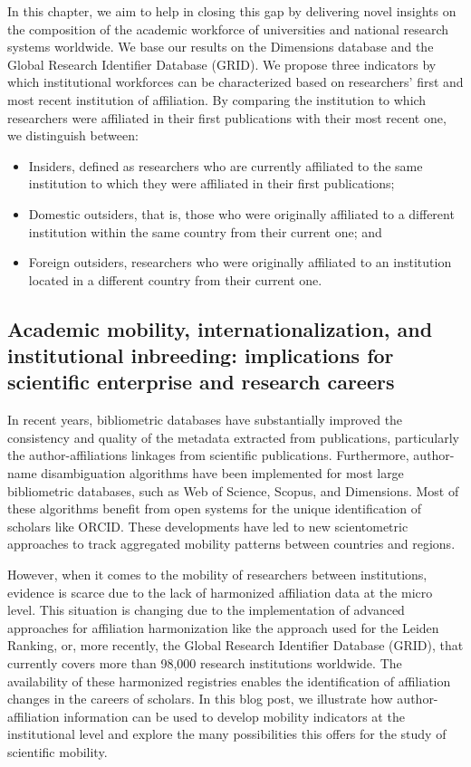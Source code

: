 \documentclass[draft,final]{vutinfth} %
\begin{document}
In this chapter, we aim to help in closing this gap by delivering novel insights on the composition of the academic workforce of universities and national research systems worldwide. We base our results on the Dimensions database and the Global Research Identifier Database (GRID). We propose three indicators by which institutional workforces can be characterized based on researchers' first and most recent institution of affiliation. By comparing the institution to which researchers were affiliated in their first publications with their most recent one, we distinguish between: 

\begin{itemize}
    \item Insiders, defined as researchers who are currently affiliated to the same institution to which they were affiliated in their first publications; 
    \item Domestic outsiders, that is, those who were originally affiliated to a different institution within the same country from their current one; and
    \item Foreign outsiders, researchers who were originally affiliated
to an institution located in a different country
from their current one.
\end{itemize}

\subsection{Academic mobility, internationalization, and institutional inbreeding: implications for scientific enterprise and research careers}



In recent years, bibliometric databases have substantially improved the consistency and quality of the metadata extracted from publications, particularly the author-affiliations linkages from scientific publications. Furthermore, author-name disambiguation algorithms have been implemented for most large bibliometric databases, such as Web of Science, Scopus, and Dimensions. Most of these algorithms benefit from open systems for the unique identification of scholars like ORCID. These developments have led to new scientometric approaches to track aggregated mobility patterns between countries and regions.

However, when it comes to the mobility of researchers between institutions, evidence is scarce due to the lack of harmonized affiliation data at the micro level. This situation is changing due to the implementation of advanced approaches for affiliation harmonization like the approach used for the Leiden Ranking, or, more recently, the Global Research Identifier Database (GRID), that currently covers more than 98,000 research institutions worldwide. The availability of these harmonized registries enables the identification of affiliation changes in the careers of scholars. In this blog post, we illustrate how author-affiliation information can be used to develop mobility indicators at the institutional level and explore the many possibilities this offers for the study of scientific mobility.
\end{document}

